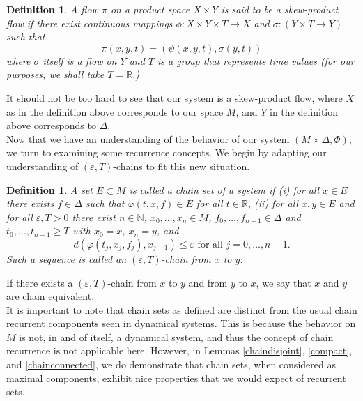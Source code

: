 \documentclass[11pt]{article}
\newtheorem{defn}[thm]{Definition}
\begin{document}
\begin{defn} A flow $\pi$ on a product space $X\times Y$ is said to be a skew-product flow if there exist continuous mappings $\phi:X\times Y\times T\rightarrow X$ and $\sigma:(Y\times T\rightarrow Y)$ such that 
$$\pi(x,y,t)=(\psi(x,y,t),\sigma(y,t))$$
where $\sigma$ itself is a flow on $Y$ and $T$ is a group that represents time values (for our purposes, we shall take $T=\mathbb{R}$.) \cite{skewproduct}
\end{defn} 

It should not be too hard to see that our system is a skew-product flow, where $X$ as in the definition above corresponds to our space $M$, and $Y$ in the definition above corresponds to $\Delta$.  \\
\indent Now that we have an understanding of the behavior of our system $(M\times\Delta, \Phi)$, we turn to examining some recurrence concepts.  We begin by adapting our understanding of $(\varepsilon,T)$-chains to fit this new situation. 


\begin{defn} \label{chain set} A set $E\subset M$ is called a chain set of a system if (i) for all $x\in E$ there exists $f\in\Delta$ such that $\varphi(t,x,f)\in E$ for all $t\in\mathbb{R}$, (ii) for all $x,y\in E$ and for all $\varepsilon,T>0$ there exist $n\in\mathbb{N}$, $x_0,\ldots,x_n\in M$, $f_0,\ldots,f_{n-1}\in\Delta$ and $t_0,\ldots,t_{n-1}\geq T$ with $x_0=x$, $x_n=y$, and 
$$d(\varphi(t_j,x_j,f_j),x_{j+1})\leq\varepsilon\mbox{ for all }j=0,\ldots,n-1.$$
Such a sequence is called an $(\varepsilon,T)$-chain from $x$ to $y$. 
\end{defn}

If there exists a $(\varepsilon,T)$-chain from $x$ to $y$ and from $y$ to $x$, we say that $x$ and $y$ are chain equivalent.\\
\indent It is important to note that chain sets as defined are distinct from the usual chain recurrent components seen in dynamical systems.  This is because the behavior on $M$ is not, in and of itself, a dynamical system, and thus the concept of chain recurrence is not applicable here.  However, in Lemmas \ref{chaindisjoint}, \ref{compact},  and \ref{chainconnected}, we do demonstrate that chain sets, when considered as maximal components, exhibit nice properties that we would expect of recurrent sets. 
\end{document}
